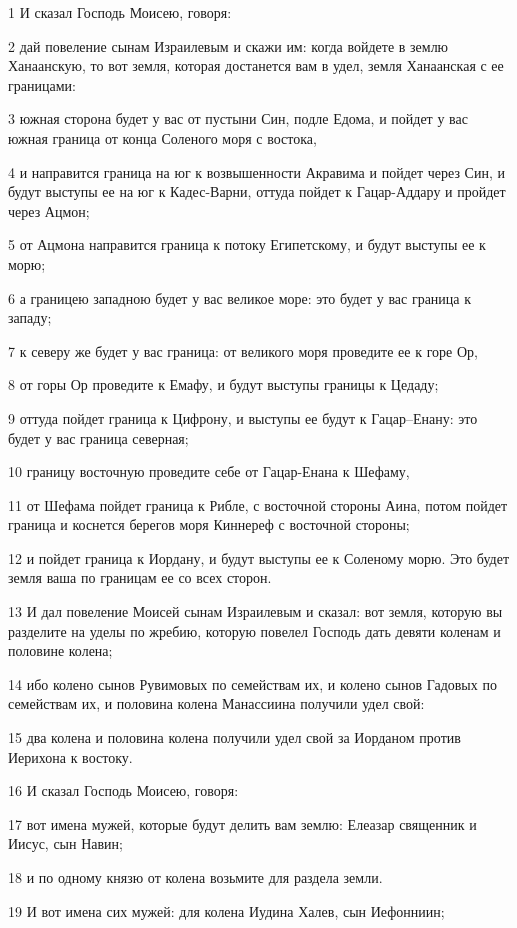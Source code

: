 \par 1 И сказал Господь Моисею, говоря:
\par 2 дай повеление сынам Израилевым и скажи им: когда войдете в землю Ханаанскую, то вот земля, которая достанется вам в удел, земля Ханаанская с ее границами:
\par 3 южная сторона будет у вас от пустыни Син, подле Едома, и пойдет у вас южная граница от конца Соленого моря с востока,
\par 4 и направится граница на юг к возвышенности Акравима и пойдет через Син, и будут выступы ее на юг к Кадес-Варни, оттуда пойдет к Гацар-Аддару и пройдет через Ацмон;
\par 5 от Ацмона направится граница к потоку Египетскому, и будут выступы ее к морю;
\par 6 а границею западною будет у вас великое море: это будет у вас граница к западу;
\par 7 к северу же будет у вас граница: от великого моря проведите ее к горе Ор,
\par 8 от горы Ор проведите к Емафу, и будут выступы границы к Цедаду;
\par 9 оттуда пойдет граница к Цифрону, и выступы ее будут к Гацар--Енану: это будет у вас граница северная;
\par 10 границу восточную проведите себе от Гацар-Енана к Шефаму,
\par 11 от Шефама пойдет граница к Рибле, с восточной стороны Аина, потом пойдет граница и коснется берегов моря Киннереф с восточной стороны;
\par 12 и пойдет граница к Иордану, и будут выступы ее к Соленому морю. Это будет земля ваша по границам ее со всех сторон.
\par 13 И дал повеление Моисей сынам Израилевым и сказал: вот земля, которую вы разделите на уделы по жребию, которую повелел Господь дать девяти коленам и половине колена;
\par 14 ибо колено сынов Рувимовых по семействам их, и колено сынов Гадовых по семействам их, и половина колена Манассиина получили удел свой:
\par 15 два колена и половина колена получили удел свой за Иорданом против Иерихона к востоку.
\par 16 И сказал Господь Моисею, говоря:
\par 17 вот имена мужей, которые будут делить вам землю: Елеазар священник и Иисус, сын Навин;
\par 18 и по одному князю от колена возьмите для раздела земли.
\par 19 И вот имена сих мужей: для колена Иудина Халев, сын Иефонниин;
